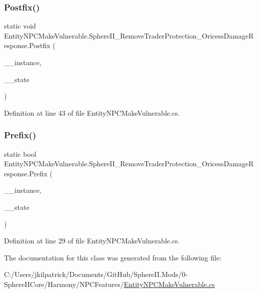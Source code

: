 \subsubsection{\texorpdfstring{Postfix()}{Postfix()}}
{\footnotesize\ttfamily static void Entity\+N\+P\+C\+Make\+Vulnerable.\+Sphere\+I\+I\+\_\+\+Remove\+Trader\+Protection\+\_\+\+Oricess\+Damage\+Response.\+Postfix (\begin{DoxyParamCaption}\item[{Entity\+N\+PC}]{\+\_\+\+\_\+instance,  }\item[{int}]{\+\_\+\+\_\+state }\end{DoxyParamCaption})\hspace{0.3cm}{\ttfamily [static]}}



Definition at line 43 of file Entity\+N\+P\+C\+Make\+Vulnerable.\+cs.

\mbox{\label{class_entity_n_p_c_make_vulnerable_1_1_sphere_i_i___remove_trader_protection___oricess_damage_response_a75138d0ba7a0dcccee168f84e3002b50}} 
\subsubsection{\texorpdfstring{Prefix()}{Prefix()}}
{\footnotesize\ttfamily static bool Entity\+N\+P\+C\+Make\+Vulnerable.\+Sphere\+I\+I\+\_\+\+Remove\+Trader\+Protection\+\_\+\+Oricess\+Damage\+Response.\+Prefix (\begin{DoxyParamCaption}\item[{Entity\+N\+PC}]{\+\_\+\+\_\+instance,  }\item[{int}]{\+\_\+\+\_\+state }\end{DoxyParamCaption})\hspace{0.3cm}{\ttfamily [static]}}



Definition at line 29 of file Entity\+N\+P\+C\+Make\+Vulnerable.\+cs.



The documentation for this class was generated from the following file\+:\begin{DoxyCompactItemize}
\item 
C\+:/\+Users/jkilpatrick/\+Documents/\+Git\+Hub/\+Sphere\+I\+I.\+Mods/0-\/\+Sphere\+I\+I\+Core/\+Harmony/\+N\+P\+C\+Features/\mbox{\hyperlink{_entity_n_p_c_make_vulnerable_8cs}{Entity\+N\+P\+C\+Make\+Vulnerable.\+cs}}\end{DoxyCompactItemize}

